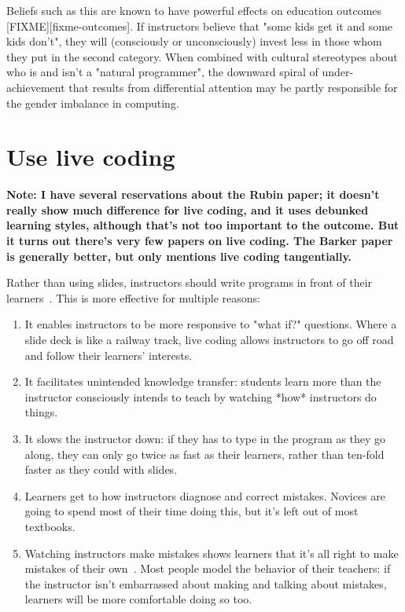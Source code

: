 \documentclass{article}
\begin{document}
Beliefs such as this are known to have powerful effects on education outcomes [FIXME][fixme-outcomes].
If instructors believe that "some kids get it and some kids don't",
they will (consciously or unconsciously) invest less in those whom they put in the second category.
When combined with cultural stereotypes about who is and isn't a "natural programmer",
the downward spiral of under-achievement that results from differential attention
may be partly responsible for the gender imbalance in computing.

\section{Use live coding}

\textbf{Note: I have several reservations about the Rubin paper; it doesn't really show much difference for live coding, and it uses debunked learning styles, although that's not too important to the outcome.  But it turns out there's very few papers on live coding.  The Barker paper is generally better, but only mentions live coding tangentially.}

Rather than using slides,
instructors should write programs in front of their learners~\cite{rubin-live-coding}.
This is more effective for multiple reasons:

\begin{enumerate}
\item It enables instructors to be more responsive to "what if?"
    questions. Where a slide deck is like a railway track, live coding
    allows instructors to go off road and follow their learners'
    interests.

\item  It facilitates unintended knowledge transfer: students learn more
    than the instructor consciously intends to teach by watching *how*
    instructors do things.

\item  It slows the instructor down: if they has to type in the program
    as they go along, they can only go twice as fast as their
    learners, rather than ten-fold faster as they could with slides.

\item  Learners get to how instructors diagnose and correct
    mistakes. Novices are going to spend most of their time doing
    this, but it's left out of most textbooks.

\item  Watching instructors make mistakes shows learners that it's all
    right to make mistakes of their own~\citep{barker-live-coding}.  Most people model the
    behavior of their teachers: if the instructor isn't embarrassed
    about making and talking about mistakes, learners will be more
    comfortable doing so too.
\end{enumerate}
\end{document}

